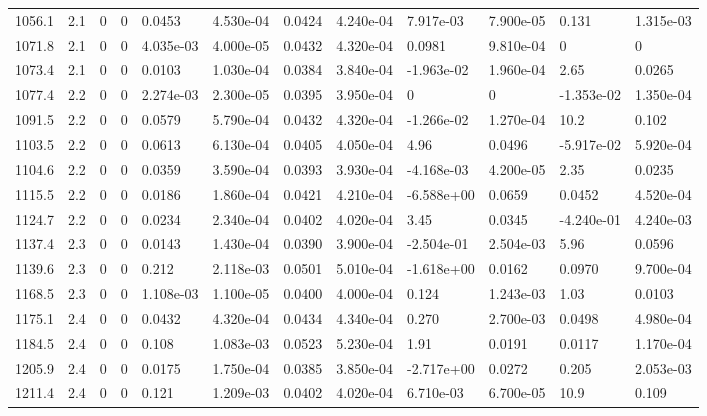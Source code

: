 \documentclass[preview]{standalone}
\begin{document}
{{{{\begin{tabular}{L{1.2cm}C{1.2cm} C{0.3cm}C{0.5cm} C{1.4cm}C{1.4cm} C{1.4cm}C{1.4cm} C{1.6cm}C{1.6cm} C{1.6cm}C{1.6cm}}
  1056.1  &   2.1  & 0     &  0 &  0.0453  & 4.530e-04  &  0.0424&   4.240e-04& 7.917e-03 & 7.900e-05   &  0.131 & 1.315e-03  \\ 
  1071.8  &   2.1  & 0     &  0 &  4.035e-03  & 4.000e-05  &  0.0432&   4.320e-04& 0.0981 & 9.810e-04   &  0 & 0  \\ 
  1073.4  &   2.1  & 0     &  0 &  0.0103  & 1.030e-04  &  0.0384&   3.840e-04& -1.963e-02 & 1.960e-04   &  2.65 & 0.0265  \\ 
  1077.4  &   2.2  & 0     &  0 &  2.274e-03  & 2.300e-05  &  0.0395&   3.950e-04& 0 & 0   &  -1.353e-02 & 1.350e-04  \\ 
  1091.5  &   2.2  & 0     &  0 &  0.0579  & 5.790e-04  &  0.0432&   4.320e-04& -1.266e-02 & 1.270e-04   &  10.2 & 0.102  \\ 
  1103.5  &   2.2  & 0     &  0 &  0.0613  & 6.130e-04  &  0.0405&   4.050e-04& 4.96 & 0.0496   &  -5.917e-02 & 5.920e-04  \\ 
  1104.6  &   2.2  & 0     &  0 &  0.0359  & 3.590e-04  &  0.0393&   3.930e-04& -4.168e-03 & 4.200e-05   &  2.35 & 0.0235  \\ 
  1115.5  &   2.2  & 0     &  0 &  0.0186  & 1.860e-04  &  0.0421&   4.210e-04& -6.588e+00 & 0.0659   &  0.0452 & 4.520e-04  \\ 
  1124.7  &   2.2  & 0     &  0 &  0.0234  & 2.340e-04  &  0.0402&   4.020e-04& 3.45 & 0.0345   &  -4.240e-01 & 4.240e-03  \\ 
  1137.4  &   2.3  & 0     &  0 &  0.0143  & 1.430e-04  &  0.0390&   3.900e-04& -2.504e-01 & 2.504e-03   &  5.96 & 0.0596  \\ 
  1139.6  &   2.3  & 0     &  0 &  0.212  & 2.118e-03  &  0.0501&   5.010e-04& -1.618e+00 & 0.0162   &  0.0970 & 9.700e-04  \\ 
  1168.5  &   2.3  & 0     &  0 &  1.108e-03  & 1.100e-05  &  0.0400&   4.000e-04& 0.124 & 1.243e-03   &  1.03 & 0.0103  \\ 
  1175.1  &   2.4  & 0     &  0 &  0.0432  & 4.320e-04  &  0.0434&   4.340e-04& 0.270 & 2.700e-03   &  0.0498 & 4.980e-04  \\ 
  1184.5  &   2.4  & 0     &  0 &  0.108  & 1.083e-03  &  0.0523&   5.230e-04& 1.91 & 0.0191   &  0.0117 & 1.170e-04  \\ 
  1205.9  &   2.4  & 0     &  0 &  0.0175  & 1.750e-04  &  0.0385&   3.850e-04& -2.717e+00 & 0.0272   &  0.205 & 2.053e-03  \\ 
  1211.4  &   2.4  & 0     &  0 &  0.121  & 1.209e-03  &  0.0402&   4.020e-04& 6.710e-03 & 6.700e-05   &  10.9 & 0.109  \\ 

\end{tabular}}}}}
\end{document}
